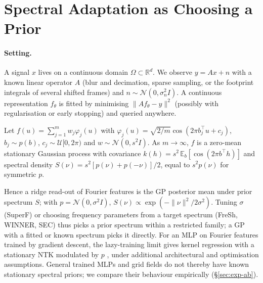 \section{Spectral Adaptation as Choosing a Prior}\label{sec:setup}

\paragraph{Setting.} A signal $x$ lives on a continuous domain
$\Omega\subset\mathbb{R}^d$. We observe $y=Ax+n$ with a known linear operator
$A$ (blur and decimation, sparse sampling, or the footprint integrals of
several shifted frames) and $n\sim\mathcal{N}(0,\sigma_n^2 I)$. A continuous
representation $f_\theta$ is fitted by minimising $\|Af_\theta-y\|^2$
(possibly with regularisation or early stopping) and queried anywhere.

\begin{proposition}\label{prop:bochner}
Let $f(u)=\sum_{j=1}^m w_j\varphi_j(u)$ with
$\varphi_j(u)=\sqrt{2/m}\cos(2\pi b_j^\top u+c_j)$, $b_j\sim p(b)$,
$c_j\sim\mathcal{U}[0,2\pi)$ and $w\sim\mathcal{N}(0,s^2I)$. As
$m\to\infty$, $f$ is a zero-mean stationary Gaussian process with covariance
$k(h)=s^2\,\mathbb{E}_b[\cos(2\pi b^\top h)]$ and spectral density
$S(\nu)=s^2[p(\nu)+p(-\nu)]/2$, equal to $s^2p(\nu)$ for symmetric $p$.
\end{proposition}
Hence a ridge read-out of Fourier features is the GP posterior mean under
prior spectrum $S$; with $p=\mathcal{N}(0,\sigma^2I)$,
$S(\nu)\propto\exp(-\|\nu\|^2/2\sigma^2)$. Tuning $\sigma$ (SuperF) or
choosing frequency parameters from a target spectrum (FreSh, WINNER, SEC)
thus picks a prior spectrum within a restricted family; a GP with a fitted or
known spectrum picks it directly. For an MLP on Fourier features trained by
gradient descent, the lazy-training limit gives kernel regression with a
stationary NTK modulated by $p$ \citep{tancik2020fourier,jacot2018ntk}, under additional architectural and optimisation assumptions. General trained MLPs and grid fields do not thereby have known stationary spectral priors; we compare their behaviour empirically
(\S\ref{sec:exp-ab}).

